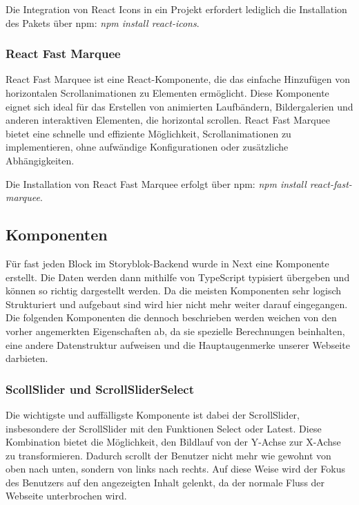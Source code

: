 Die Integration von React Icons in ein Projekt erfordert lediglich die Installation des Pakets über npm: \emph{npm install react-icons}.

\subsubsection*{React Fast Marquee}
React Fast Marquee ist eine React-Komponente, die das einfache Hinzufügen von horizontalen Scrollanimationen zu Elementen ermöglicht. Diese Komponente eignet sich ideal für das Erstellen von animierten Laufbändern, Bildergalerien und anderen interaktiven Elementen, die horizontal scrollen. React Fast Marquee bietet eine schnelle und effiziente Möglichkeit, Scrollanimationen zu implementieren, ohne aufwändige Konfigurationen oder zusätzliche Abhängigkeiten. 

Die Installation von React Fast Marquee erfolgt über npm: \emph{npm install react-fast-marquee}.

\subsection{Komponenten}

Für fast jeden Block im Storyblok-Backend wurde in Next eine Komponente erstellt. Die Daten werden dann mithilfe von TypeScript typisiert übergeben und können so richtig dargestellt werden. Da die meisten Komponenten sehr logisch Strukturiert und aufgebaut sind wird hier nicht mehr weiter darauf eingegangen. Die folgenden Komponenten die dennoch beschrieben werden weichen von den vorher angemerkten Eigenschaften ab, da sie spezielle Berechnungen beinhalten, eine andere Datenstruktur aufweisen und die Hauptaugenmerke unserer Webseite darbieten.

\subsubsection*{ScollSlider und ScrollSliderSelect}

Die wichtigste und auffälligste Komponente ist dabei der ScrollSlider, insbesondere der ScrollSlider mit den Funktionen Select oder Latest. Diese Kombination bietet die Möglichkeit, den Bildlauf von der Y-Achse zur X-Achse zu transformieren. Dadurch scrollt der Benutzer nicht mehr wie gewohnt von oben nach unten, sondern von links nach rechts. Auf diese Weise wird der Fokus des Benutzers auf den angezeigten Inhalt gelenkt, da der normale Fluss der Webseite unterbrochen wird.

